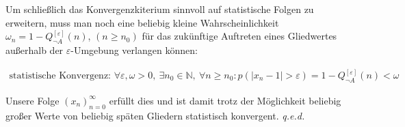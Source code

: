 \documentclass[a4paper]{scrartcl}
\begin{document}
\begin{minipage}[t]{0.84\linewidth}
Um schließlich das Konvergenzkiterium sinnvoll auf statistische Folgen zu erweitern, muss man noch eine beliebig kleine Wahrscheinlichkeit $\omega_n = 1- \textstyle{Q}_{\neg{A}}^{[\varepsilon]}(n)$, $(n\geqslant n_0)$ für das zukünftige Auftreten eines Gliedwertes außerhalb der $\varepsilon$-Umgebung verlangen können:
\end{minipage}
\begin{align*}
\text{statistische Konvergenz:  }
\forall\varepsilon,\omega > 0, ~\exists n_0 \in \mathbb{N}, ~\forall n \geqslant n_0 : p\left(| x_n - 1| > \varepsilon\right) = 1- \textstyle{Q}_{\neg{A}}^{[\varepsilon]}(n) < \omega
\end{align*}
\begin{minipage}[t]{0.84\linewidth}
Unsere Folge $(x_n)_{n=0}^{\infty}$ erfüllt dies und ist damit trotz der Möglichkeit beliebig großer Werte von beliebig späten Gliedern statistisch konvergent. \hfill{} \textit{q.e.d.}	
\end{minipage}
\end{document}
